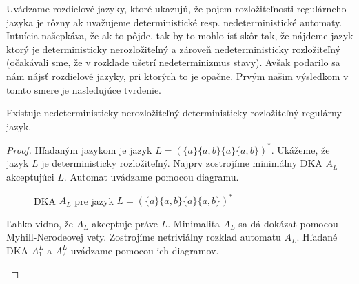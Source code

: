 Uvádzame rozdielové jazyky, ktoré ukazujú, že pojem rozložiteľnosti regulárneho jazyka je rôzny ak uvažujeme deterministické resp. nedeterministické automaty. Intuícia našepkáva, že ak to pôjde, tak by to mohlo ísť skôr tak, že nájdeme jazyk ktorý je deterministicky nerozložiteľný a zároveň nedeterministicky rozložiteľný (očakávali sme, že v rozklade ušetrí nedeterminizmus stavy). Avšak podarilo sa nám nájsť rozdielové jazyky, pri ktorých to je opačne. Prvým našim výsledkom v tomto smere je nasledujúce tvrdenie.

\begin{theorem}
Existuje nedeterministicky nerozložiteľný deterministicky rozložiteľný regulárny jazyk.
\end{theorem}

\begin{proof}
Hľadaným jazykom je jazyk $ L = (\lbrace a \rbrace \lbrace a,b \rbrace \lbrace a \rbrace \lbrace a,b \rbrace)^* $. Ukážeme, že jazyk $ L $ je deterministicky rozložiteľný. Najprv zostrojíme minimálny DKA $ A_{L} $ akceptujúci $ L $. Automat uvádzame pomocou diagramu.

\begin{figure}[H]
\centering
{}
\caption{DKA $ A_{L} $ pre jazyk $ L = (\lbrace a \rbrace \lbrace a,b \rbrace \lbrace a \rbrace \lbrace a,b \rbrace)^* $} \label{fig:DFAa(a|b)a(a|b)^4}
\end{figure}

Ľahko vidno, že $ A_L $ akceptuje práve $ L $. Minimalita $ A_L $ sa dá dokázať pomocou Myhill-Nerodeovej vety. Zostrojíme netriviálny rozklad automatu $ A_L $. Hľadané DKA $ A_1^L $ a $ A_2^L $ uvádzame pomocou ich diagramov.

\begin{figure}[H]
\centering
{}
\end{figure}
\end{proof}
